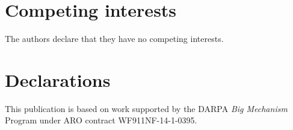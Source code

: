 \documentclass[twocolumn]{bmcart}%
\begin{document}
\begin{backmatter}
%





\section*{Competing interests}
The authors declare that they have no competing interests.


\section*{Declarations}
This publication is based on work supported by the DARPA \emph{Big Mechanism} Program under ARO contract WF911NF-14-1-0395.





\end{backmatter}
\end{document}
